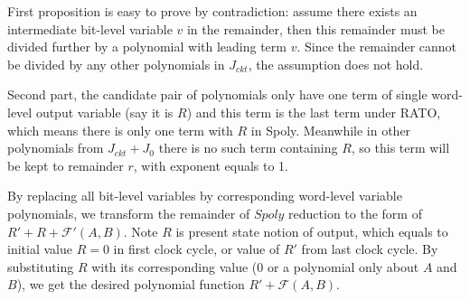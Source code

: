 \begin{Proof}
First proposition is easy to prove by contradiction: assume there exists an intermediate bit-level variable $v$ in the remainder,
then this remainder must be divided further by a polynomial with leading term $v$. 
Since the remainder cannot be divided by any other polynomials in $J_{ckt}$, the assumption does not hold.

Second part, the candidate pair of polynomials only have one term of
single word-level output variable (say it is $R$) and this term is the last term under RATO, which means there is only one term with
$R$ in Spoly. Meanwhile in other polynomials from $J_{ckt}+J_0$ there is no such term containing $R$, so this term will be
kept to remainder $r$, with exponent equals to 1.
\end{Proof}

By replacing all bit-level variables by corresponding word-level variable polynomials, we transform the remainder
of $Spoly$ reduction to the form of $R'+R+\mathcal F'(A,B)$. Note $R$ is present state notion of output, which
equals to initial value $R=0$ in first clock cycle, or value of $R'$ from last clock cycle. By substituting
$R$ with its corresponding value ($0$ or a polynomial only about $A$ and $B$), we get the desired polynomial function
$R'+\mathcal F(A,B)$.

